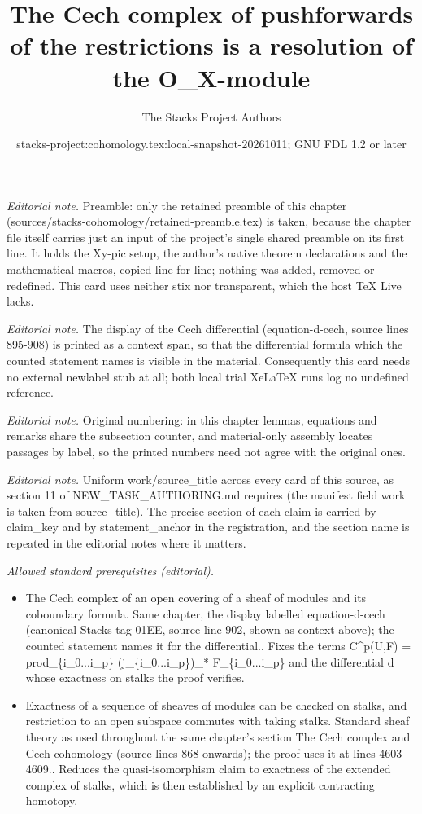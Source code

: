 \documentclass[10pt,a4paper]{amsart}
\title{The Cech complex of pushforwards of the restrictions is a resolution of the O\_X-module}
\author{The Stacks Project Authors}
\date{stacks-project:cohomology.tex:local-snapshot-20261011; GNU FDL 1.2 or later}
\theoremstyle{plain}
\theoremstyle{definition}
\theoremstyle{remark}
\numberwithin{equation}{subsection}
\begin{document}
\maketitle
\noindent\textit{Editorial note.} Preamble: only the retained preamble of this chapter (sources/stacks-cohomology/retained-preamble.tex) is taken, because the chapter file itself carries just an input of the project's single shared preamble on its first line. It holds the Xy-pic setup, the author's native theorem declarations and the mathematical macros, copied line for line; nothing was added, removed or redefined. This card uses neither stix nor transparent, which the host TeX Live lacks.\par\medskip
\noindent\textit{Editorial note.} The display of the Cech differential (equation-d-cech, source lines 895-908) is printed as a context span, so that the differential formula which the counted statement names is visible in the material. Consequently this card needs no external newlabel stub at all; both local trial XeLaTeX runs log no undefined reference.\par\medskip
\noindent\textit{Editorial note.} Original numbering: in this chapter lemmas, equations and remarks share the subsection counter, and material-only assembly locates passages by label, so the printed numbers need not agree with the original ones.\par\medskip
\noindent\textit{Editorial note.} Uniform work/source\_title across every card of this source, as section 11 of NEW\_TASK\_AUTHORING.md requires (the manifest field work is taken from source\_title). The precise section of each claim is carried by claim\_key and by statement\_anchor in the registration, and the section name is repeated in the editorial notes where it matters.\par\medskip
\noindent\textit{Allowed standard prerequisites (editorial).}\begin{itemize}
\item The Cech complex of an open covering of a sheaf of modules and its coboundary formula. Same chapter, the display labelled equation-d-cech (canonical Stacks tag 01EE, source line 902, shown as context above); the counted statement names it for the differential.. Fixes the terms C\textasciicircum{}p(U,F) = prod\_\{i\_0...i\_p\} (j\_\{i\_0...i\_p\})\_* F\_\{i\_0...i\_p\} and the differential d whose exactness on stalks the proof verifies.
\item Exactness of a sequence of sheaves of modules can be checked on stalks, and restriction to an open subspace commutes with taking stalks. Standard sheaf theory as used throughout the same chapter's section The Cech complex and Cech cohomology (source lines 868 onwards); the proof uses it at lines 4603-4609.. Reduces the quasi-isomorphism claim to exactness of the extended complex of stalks, which is then established by an explicit contracting homotopy.
\end{itemize}\medskip
\end{document}
